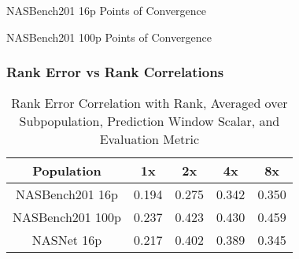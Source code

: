 \documentclass[twocolumn]{article}
\begin{document}
\begin{table}[!h]
    \begin{center}
        \caption{NASBench201 16p Points of Convergence}
        \label{table:nasnet_convergence}
    \end{center}
\end{table}

\begin{table}[!h]
    \begin{center}
        \caption{NASBench201 100p Points of Convergence}
        \label{table:nasnet_convergence}
    \end{center}
\end{table}

\FloatBarrier
\subsubsection{Rank Error vs Rank Correlations}

\begin{table}[!h]
    \begin{center}
        \begin{tabular}{c | c | c | c | c}
            \toprule
            Population          & 1x    & 2x    &4x     & 8x    \\
            \midrule
            NASBench201 16p     & 0.194 & 0.275 & 0.342 & 0.350 \\
            NASBench201 100p    & 0.237 & 0.423 & 0.430 & 0.459 \\
            NASNet 16p          & 0.217 & 0.402 & 0.389 & 0.345 \\
            \bottomrule
        \end{tabular}
        \caption{Rank Error Correlation with Rank, Averaged over Subpopulation, Prediction Window Scalar, and Evaluation Metric}
        \label{table:rank_error_corr}
    \end{center}
\end{table}
\end{document}
